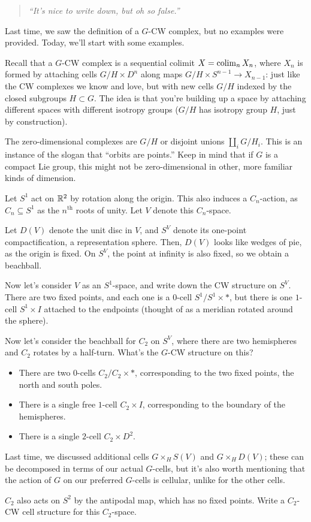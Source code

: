 \begin{quote}\textit{
	``It's nice to write down, but oh so false.''
}\end{quote}
Last time, we saw the definition of a $G$-CW complex, but no examples were provided. Today, we'll start with some
examples.

Recall that a $G$-CW complex is a sequential colimit $X = \operatorname{colim}_n X_n$, where $X_n$ is formed by attaching cells
$G/H\times D^n$ along maps $G/H\times S^{n-1}\to X_{n-1}$: just like the CW complexes we know and love, but with
new cells $G/H$ indexed by the closed subgroups $H\subset G$. The idea is that you're building up a space by
attaching different spaces with different isotropy groups ($G/H$ has isotropy group $H$, just by construction).
\begin{exm}
The zero-dimensional complexes are $G/H$ or disjoint unions $\amalg_i G/H_i$. This is an instance of the slogan
that ``orbits are points.'' Keep in mind that if $G$ is a compact Lie group, this might not be zero-dimensional in
other, more familiar kinds of dimension.
\end{exm}
\begin{exm}
Let $S^1$ act on $\mathbb R^2$ by rotation along the origin. This also induces a $C_n$-action, as $C_n\subseteq S^1$ as
the $n^{\text{th}}$ roots of unity. Let $V$ denote this $C_n$-space.

Let $D(V)$ denote the unit disc in $V$, and $S^V$ denote its one-point compactification, a representation sphere.
Then, $D(V)$ looks like wedges of pie, as the origin is fixed. On $S^V$, the point at infinity is also fixed, so we
obtain a beachball. %

Now let's consider $V$ as an $S^1$-space, and write down the CW structure on $S^V$. There are two fixed points, and
each one is a $0$-cell $S^1/S^1\times *$, but there is one $1$-cell $S^1\times I$ attached to the endpoints
(thought of as a meridian rotated around the sphere).

Now let's consider the beachball for $C_2$ on $S^V$, where there are two hemispheres and $C_2$ rotates by a
half-turn. What's the $G$-CW structure on this?
\begin{itemize}
	\item There are two $0$-cells $C_2/C_2\times *$, corresponding to the two fixed points, the north and south
	poles.
	\item There is a single free $1$-cell $C_2\times I$, corresponding to the boundary of the hemispheres.
	\item There is a single $2$-cell $C_2\times D^2$.\qedhere
\end{itemize}
\end{exm}
Last time, we discussed additional cells $G\times_H S(V)$ and $G\times_H D(V)$; these can be decomposed in terms of
our actual $G$-cells, but it's also worth mentioning that the action of $G$ on our preferred $G$-cells is cellular,
unlike for the other cells.
\begin{ex}
$C_2$ also acts on $S^2$ by the antipodal map, which has no fixed points. Write a $C_2$-CW cell structure for this
$C_2$-space.
\end{ex}

